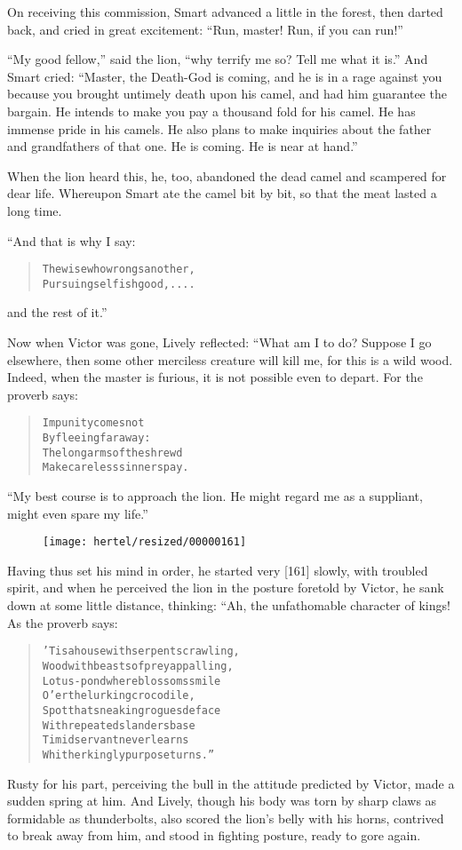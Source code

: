 \documentclass[article, twoside, 10pt]{memoir}
\renewenvironment{verbatim}{%
\begin{quote}%
\vskip -10pt%
\begin{alltt}\normalfont\small}{\end{alltt}%
\end{quote}%
\vskip -10pt
} %
\begin{document}
On receiving this commission, Smart advanced a little in the
forest, then darted back, and cried in great excitement:
``Run, master! Run, if you can run!''

``My good fellow,'' said the lion,
``why terrify me so? Tell me what it is.'' And Smart cried:
``Master, the Death-God is coming, and he is in a rage against you because you brought untimely death upon his camel, and had him guarantee the bargain. He intends to make you pay a thousand fold for his camel. He has immense pride in his camels. He also plans to make inquiries about the father and grandfathers of that one. He is coming. He is near at hand.''

When the lion heard this, he, too, abandoned the dead camel and
scampered for dear life. Whereupon Smart ate the camel bit by bit,
so that the meat lasted a long time.

“And that is why I say:

\begin{verbatim}
The wise who wrongs another,
    Pursuing selfish good, ....
\end{verbatim}
and the rest of it.”

Now when Victor was gone, Lively reflected: “What am I to do?
Suppose I go elsewhere, then some other merciless creature will
kill me, for this is a wild wood. Indeed, when the master is
furious, it is not possible even to depart. For the proverb says:

\begin{verbatim}
Impunity comes not
    By fleeing far away:
The long arms of the shrewd
    Make careless sinners pay.
\end{verbatim}
``My best course is to approach the lion. He might regard me as a suppliant, might even spare my life.''

\begin{figure}[p]\texttt{[image: hertel/resized/00000161]}\end{figure}Having thus set his mind in order, he started very [161] slowly,
with troubled spirit, and when he perceived the lion in the posture
foretold by Victor, he sank down at some little distance, thinking:
“Ah, the unfathomable character of kings! As the proverb says:

\begin{verbatim}
'Tis a house with serpents crawling,
Wood with beasts of prey appalling,
Lotus-pond where blossoms smile
O'er the lurking crocodile,
Spot that sneaking rogues deface
With repeated slanders base{\textemdash}
Timid servant never learns
Whither kingly purpose turns.”
\end{verbatim}
Rusty for his part, perceiving the bull in the attitude predicted
by Victor, made a sudden spring at him. And Lively, though his body
was torn by sharp claws as formidable as thunderbolts, also scored
the lion's belly with his horns, contrived to break away from him,
and stood in fighting posture, ready to gore again.
\end{document}
